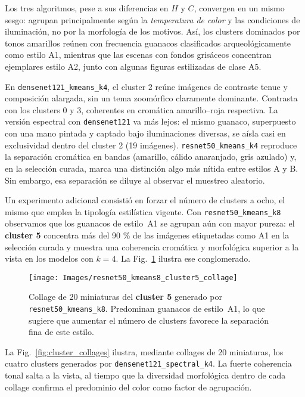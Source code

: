 Los tres algoritmos, pese a sus diferencias en $H$ y $C$, convergen en un mismo sesgo: agrupan principalmente según la \emph{temperatura de color} y las condiciones de iluminación, no por la morfología de los motivos.
Así, los clusters dominados por tonos amarillos reúnen con frecuencia guanacos clasificados arqueológicamente como estilo A1, mientras que las escenas con fondos grisáceos concentran ejemplares estilo A2, junto con algunas figuras estilizadas de clase A5.

En \texttt{densenet121\_kmeans\_k4}, el cluster 2 reúne imágenes de contraste tenue y composición alargada, sin un tema zoomórfico claramente dominante.
Contrasta con los clusters 0 y 3, coherentes en cromática amarillo–roja respectiva.
La versión espectral con \texttt{densenet121} va más lejos: el mismo guanaco, superpuesto con una mano pintada y captado bajo iluminaciones diversas, se aísla casi en exclusividad dentro del cluster 2 (19 imágenes).
\texttt{resnet50\_kmeans\_k4} reproduce la separación cromática en bandas (amarillo, cálido anaranjado, gris azulado) y, en la selección curada, marca una distinción algo más nítida entre estilos A y B.
Sin embargo, esa separación se diluye al observar el muestreo aleatorio.

Un experimento adicional consistió en forzar el número de clusters a ocho, el mismo que emplea la tipología estilística vigente.
Con \texttt{resnet50\_kmeans\_k8} observamos que los guanacos de estilo~A1 se agrupan aún con mayor pureza: el \textbf{cluster 5} concentra más del 90 \% de las imágenes etiquetadas como A1 en la selección curada y muestra una coherencia cromática y morfológica superior a la vista en los modelos con $k=4$.
La Fig.~\ref{fig:r50k8_cluster5} ilustra ese conglomerado.

\begin{figure}[!h]
  \centering
  \texttt{[image: Images/resnet50\_kmeans8\_cluster5\_collage]}
  \caption{Collage de 20 miniaturas del \textbf{cluster 5} generado por \texttt{resnet50\_kmeans\_k8}.
  Predominan guanacos de estilo~A1, lo que sugiere que aumentar el número de clusters favorece la separación fina de este estilo.}
  \label{fig:r50k8_cluster5}
\end{figure}

La Fig.~\ref{fig:cluster_collages} ilustra, mediante collages de 20 miniaturas, los cuatro clusters generados por \texttt{densenet121\_spectral\_k4}.
La fuerte coherencia tonal salta a la vista, al tiempo que la diversidad morfológica dentro de cada collage confirma el predominio del color como factor de agrupación.

